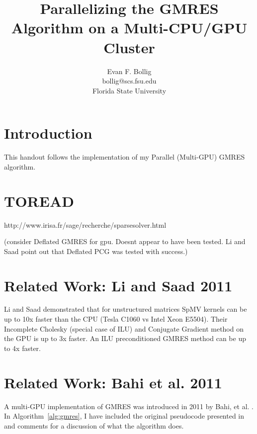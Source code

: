 \documentclass[10pt]{article}
\title{Parallelizing the GMRES Algorithm on a Multi-CPU/GPU Cluster}
\author{Evan F. Bollig \\ bollig@scs.fsu.edu \\ Florida State University 
}
\begin{document}
\maketitle

\section{Introduction}
This handout follows the implementation of my Parallel (Multi-GPU) GMRES algorithm. 

\section{TOREAD} 

http://www.irisa.fr/sage/recherche/sparsesolver.html

(consider Deflated GMRES for gpu. Doesnt appear to have been tested. Li and Saad point out that Deflated PCG was tested with success.)

\section{Related Work: Li and Saad 2011} 

Li and Saad demonstrated that for unstructured matrices SpMV kernels can be up to 10x faster than the CPU (Tesla C1060 vs Intel Xeon E5504). 
Their Incomplete Cholesky (special case of ILU) and Conjugate Gradient method on the GPU is up to 3x faster. 
An ILU preconditioned GMRES method can be up to 4x faster. 


\section{Related Work: Bahi et al. 2011}
A multi-GPU implementation of GMRES was introduced in 2011 by Bahi, et al. \cite{Bahi2011}. In Algorithm~\ref{alg:gmres}, I have included the original pseudocode presented in \cite{Bahi2011} and {\color{blue}comments} for a discussion of what the algorithm does. 
\end{document}
